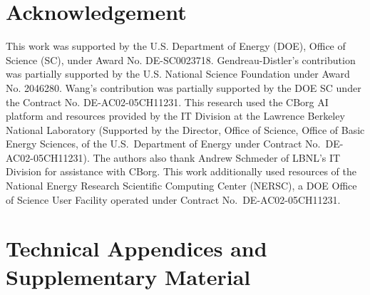 \documentclass[aps,prd,reprint,superscriptaddress]{revtex4-2}
\begin{document}
\section*{Acknowledgement}
This work was supported by the U.S. Department of Energy (DOE), Office of Science (SC), under Award No. DE-SC0023718.  Gendreau-Distler’s contribution was partially supported by the U.S. National Science Foundation under Award No. 2046280. Wang's contribution was partially supported by the DOE SC under the Contract No. DE-AC02-05CH11231. This research used the CBorg AI platform and resources provided by the IT Division at the Lawrence Berkeley National Laboratory (Supported by the Director, Office of Science, Office of Basic Energy Sciences, of the U.S.\ Department of Energy under Contract No.\ DE-AC02-05CH11231). The authors also thank Andrew Schmeder of LBNL’s IT Division for assistance with CBorg. This work additionally used resources of the National Energy Research Scientific Computing Center (NERSC), a DOE Office of Science User Facility operated under Contract No.\ DE-AC02-05CH11231. %

\newpage



\newpage
\appendix

\section{Technical Appendices and Supplementary Material}\label{appendix:physics_details}





\end{document}
